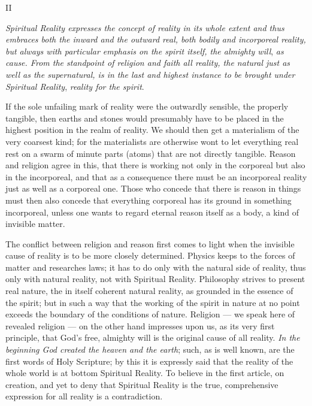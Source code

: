 \documentclass[12pt,a4paper,openany]{book}
\newcommand{\opage}[1]{\marginnote{\footnotesize\textit{[#1]}}}
\begin{document}
\begin{center}II\end{center}

\emph{Spiritual Reality expresses the concept of reality
in its whole extent and
\setcounter{footnote}{0}%
\opage{8}thus embraces both the inward and the outward
real, both bodily and incorporeal
reality, but always with particular emphasis
on the spirit itself, the almighty will},
\emph{as cause. From the standpoint of religion and faith
all reality, the natural just as
well as the supernatural, is in the last and highest
instance to be brought under Spiritual Reality},
\emph{reality for the spirit}.

If the sole unfailing mark of reality
were the outwardly sensible, the properly tangible,
then earths and stones would presumably have to be
placed in the highest position in the realm of reality. We should then get
a materialism of the very coarsest kind; for the materialists
are otherwise wont to let everything real rest on a
swarm of minute parts (atoms) that are not directly
tangible. Reason and religion agree in this,
that there is working not only in the corporeal but also
in the incorporeal, and that as a consequence there
must be an incorporeal reality just as well as a corporeal one.
Those who concede that there is reason in things must then
also concede that everything corporeal has its ground in something
incorporeal, unless one wants to regard eternal
reason itself as a body, a kind of invisible matter.

The conflict between religion and reason first comes to
light when the invisible cause of reality is to be more closely
determined. Physics keeps to the forces of matter
and researches laws; it has to do only with the natural
side of reality, thus only with natural reality, not with
Spiritual Reality. Philosophy strives to
present real nature, the in itself
\setcounter{footnote}{0}%
\opage{9}coherent natural reality, as grounded in the essence of the spirit;
but in such a way that the working of the spirit in nature at no
point exceeds the boundary of the conditions of nature.
Religion --- we speak here of revealed religion ---
on the other hand impresses upon us, as its very first principle,
that God's free, almighty will is the original cause
of all reality. \emph{In the beginning God created
the heaven and the earth}; such, as is well known, are the first
words of Holy Scripture; by this it is expressly said
that the reality of the whole world is at bottom Spiritual Reality.
To believe in the first article, on creation, and
yet to deny that Spiritual Reality is the true, comprehensive
expression for all reality is a contradiction.
\end{document}
